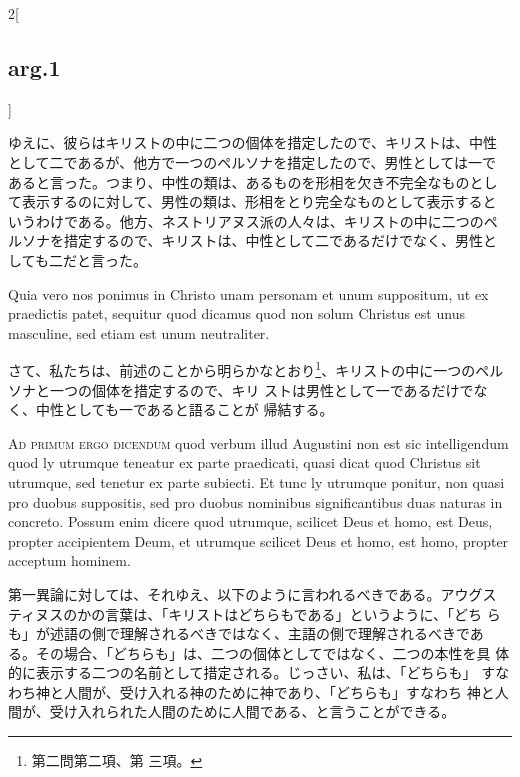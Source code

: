 \documentclass[paper=a4paper,fontsize=10pt,jafontsize=9pt,titlepage]{jlreq}
\begin{document}
\begin{paracol}{2}[\subsection{arg.1}]
\switchcolumn

ゆえに、彼らはキリストの中に二つの個体を措定したので、キリストは、中性
として二であるが、他方で一つのペルソナを措定したので、男性としては一で
あると言った。つまり、中性の類は、あるものを形相を欠き不完全なものとし
て表示するのに対して、男性の類は、形相をとり完全なものとして表示すると
いうわけである。他方、ネストリアヌス派の人々は、キリストの中に二つのペ
ルソナを措定するので、キリストは、中性として二であるだけでなく、男性と
しても二だと言った。

\switchcolumn*

Quia vero nos ponimus in Christo unam personam et unum suppositum, ut
ex praedictis patet, sequitur quod dicamus quod non solum Christus est
unus masculine, sed etiam est unum neutraliter.

\switchcolumn

さて、私たちは、前述のことから明らかなとおり\footnote{第二問第二項、第
 三項。}、キリストの中に一つのペルソナと一つの個体を措定するので、キリ
 ストは男性として一であるだけでなく、中性としても一であると語ることが
 帰結する。

\switchcolumn*[\subsection{ad.1}]

{\scshape Ad primum ergo dicendum} quod verbum illud Augustini non est
sic intelligendum quod ly utrumque teneatur ex parte praedicati, quasi
dicat quod Christus sit utrumque, sed tenetur ex parte subiecti. Et
tunc ly utrumque ponitur, non quasi pro duobus suppositis, sed pro
duobus nominibus significantibus duas naturas in concreto. Possum enim
dicere quod utrumque, scilicet Deus et homo, est Deus, propter
accipientem Deum, et utrumque scilicet Deus et homo, est homo, propter
acceptum hominem.

\switchcolumn

第一異論に対しては、それゆえ、以下のように言われるべきである。アウグス
ティヌスのかの言葉は、「キリストはどちらもである」というように、「どち
らも」が述語の側で理解されるべきではなく、主語の側で理解されるべきであ
る。その場合、「どちらも」は、二つの個体としてではなく、二つの本性を具
体的に表示する二つの名前として措定される。じっさい、私は、「どちらも」
すなわち神と人間が、受け入れる神のために神であり、「どちらも」すなわち
神と人間が、受け入れられた人間のために人間である、と言うことができる。

\switchcolumn*[\subsection{ad.2}]


\end{paracol}
\end{document}
